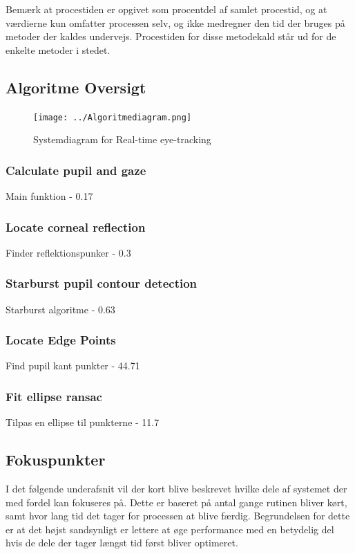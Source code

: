 \documentclass[rapport.tex]{subfiles}
\begin{document}
	
	Bemærk at procestiden er opgivet som procentdel af samlet procestid, og at værdierne kun omfatter processen selv, og ikke medregner den tid der bruges på metoder der kaldes undervejs. Procestiden for disse metodekald står ud for de enkelte metoder i stedet.
	
	\subsection{Algoritme Oversigt}
	\begin{figure}[h]
		\centering
		\texttt{[image: ../Algoritmediagram.png]}
		\caption[Systemdiagram]{Systemdiagram for Real-time eye-tracking}
		\label{fig:Systemdiagram}
	\end{figure}
	
	\subsubsection{Calculate pupil and gaze}
	
	Main funktion - 0.17%
	
	\subsubsection{Locate corneal reflection}
	
	Finder reflektionspunker - 0.3%
	
	\subsubsection{Starburst pupil contour detection}
	
	Starburst algoritme - 0.63%
	
	\subsubsection{Locate Edge Points}
	
	Find pupil kant punkter - 44.71%
	
	\subsubsection{Fit ellipse ransac}
	
	Tilpas en ellipse til punkterne - 11.7%
	
	\subsection{Fokuspunkter}
	I det følgende underafsnit vil der kort blive beskrevet hvilke dele af systemet der med fordel kan fokuseres på. Dette er baseret på antal gange rutinen bliver kørt, samt hvor lang tid det tager for processen at blive færdig. Begrundelsen for dette er at det højst sandsynligt er lettere at øge performance med en betydelig del hvis de dele der tager længst tid først bliver optimeret.
	
\end{document}
